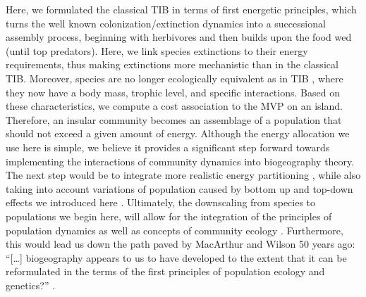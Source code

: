 Here, we formulated the classical TIB in terms of first energetic
principles, which turns the well known colonization/extinction dynamics
into a successional assembly process, beginning with herbivores and then
builds upon the food wed (until top predators). Here, we link species
extinctions to their energy requirements, thus making extinctions more
mechanistic than in the classical TIB. Moreover, species are no longer
ecologically equivalent as in TIB \citep{Lomolino2009}, where they now
have a body mass, trophic level, and specific interactions. Based on
these characteristics, we compute a cost association to the MVP on an
island. Therefore, an insular community becomes an assemblage of a
population that should not exceed a given amount of energy. Although the
energy allocation we use here is simple, we believe it provides a
significant step forward towards implementing the interactions of
community dynamics into biogeography theory. The next step would be to
integrate more realistic energy partitioning \citep{DeRuiter1995}, while
also taking into account variations of population caused by bottom up
and top-down effects we introduced here \citep{Terborgh2001, Brown2013}.
Ultimately, the downscaling from species to populations we begin here,
will allow for the integration of the principles of population dynamics
as well as concepts of community ecology \citep[\emph{i.e.}, stability
of a community][]{Allesina2012a}. Furthermore, this would lead us down
the path paved by MacArthur and Wilson 50 years ago: ``{[}\ldots{}{]}
biogeography appears to us to have developed to the extent that it can
be reformulated in the terms of the first principles of population
ecology and genetics?'' \citep[p.183]{MacArthur1967}.

